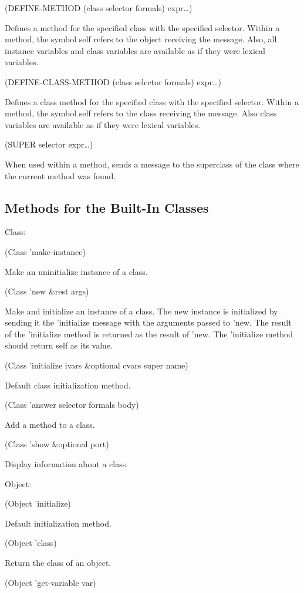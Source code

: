 \documentclass[11pt]{article}
\begin{document}
(DEFINE-METHOD (class selector formals) expr\ldots{})

Defines a method for the specified class with the specified selector.
Within a method, the symbol self refers to the object receiving the
message.  Also, all instance variables and class variables are available
as if they were lexical variables.

(DEFINE-CLASS-METHOD (class selector formals) expr\ldots{})

Defines a class method for the specified class with the specified
selector.  Within a method, the symbol self refers to the class
receiving the message.  Also class variables are available as if they
were lexical variables.

(SUPER selector expr\ldots{})

When used within a method, sends a message to the superclass of the
class where the current method was found.
\subsection{Methods for the Built-In Classes}
\label{sec-1-14}

Class:

(Class 'make-instance)

Make an uninitialize instance of a class.

(Class 'new \&rest args)

Make and initialize an instance of a class.  The new instance is
initialized by sending it the 'initialize message with the arguments
passed to 'new.  The result of the 'initialize method is returned as
the result of 'new.  The 'initialize method should return self as
its value.

(Class 'initialize ivars \&optional cvars super name)

Default class initialization method.

(Class 'answer selector formals body)

Add a method to a class.

(Class 'show \&optional port)

Display information about a class.


Object:

(Object 'initialize)

Default initialization method.

(Object 'class)

Return the class of an object.

(Object 'get-variable var)
\end{document}
